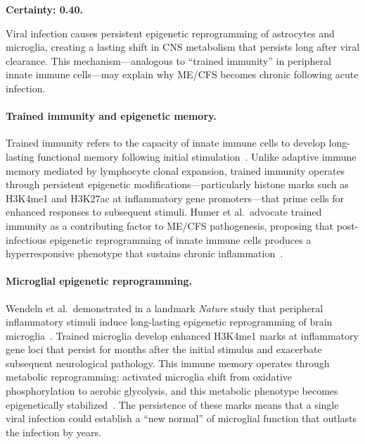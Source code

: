 \begin{speculation}
\label{spec:post-viral-cns-reprogramming}
\textbf{Certainty: 0.40.}

Viral infection causes persistent epigenetic reprogramming of astrocytes and microglia, creating a lasting shift in CNS metabolism that persists long after viral clearance. This mechanism---analogous to ``trained immunity'' in peripheral innate immune cells---may explain why ME/CFS becomes chronic following acute infection.

\paragraph{Trained immunity and epigenetic memory.}
Trained immunity refers to the capacity of innate immune cells to develop long-lasting functional memory following initial stimulation~\cite{Humer2025TrainedImmunityMECFS}. Unlike adaptive immune memory mediated by lymphocyte clonal expansion, trained immunity operates through persistent epigenetic modifications---particularly histone marks such as H3K4me1 and H3K27ac at inflammatory gene promoters---that prime cells for enhanced responses to subsequent stimuli. Humer et al.\ advocate trained immunity as a contributing factor to ME/CFS pathogenesis, proposing that post-infectious epigenetic reprogramming of innate immune cells produces a hyperresponsive phenotype that sustains chronic inflammation~\cite{Humer2025TrainedImmunityMECFS}.

\paragraph{Microglial epigenetic reprogramming.}
Wendeln et al.\ demonstrated in a landmark \textit{Nature} study that peripheral inflammatory stimuli induce long-lasting epigenetic reprogramming of brain microglia~\cite{Wendeln2018InnateImmuneMemoryBrain}. Trained microglia develop enhanced H3K4me1 marks at inflammatory gene loci that persist for months after the initial stimulus and exacerbate subsequent neurological pathology. This immune memory operates through metabolic reprogramming: activated microglia shift from oxidative phosphorylation to aerobic glycolysis, and this metabolic phenotype becomes epigenetically stabilized~\cite{Nirakis2025MetabolicRegulationMicroglial}. The persistence of these marks means that a single viral infection could establish a ``new normal'' of microglial function that outlasts the infection by years.


\end{speculation}
